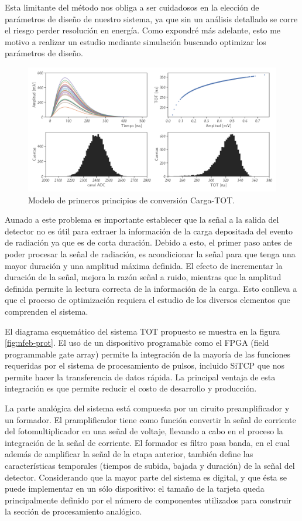 Esta limitante del método nos obliga a ser cuidadosos en la elección de parámetros de diseño de nuestro sistema, ya que sin un análisis detallado se corre el riesgo perder resolución en energía. Como expondré más adelante, esto me motivo a realizar un estudio mediante simulación buscando optimizar los parámetros de diseño.

\begin{figure}
        \centering
        \includegraphics[width=\textwidth]{TOT-model.pdf}
        \caption{Modelo de primeros principios de conversión Carga-TOT.}
        \label{fig:tot-model}
\end{figure}

Aunado a este problema es importante establecer que la señal a la salida del detector no es útil para extraer la información de la carga depositada del evento de radiación ya que es de corta duración. Debido a esto, el primer paso antes de poder procesar la señal de radiación, es acondicionar la señal para que tenga una mayor duración y una amplitud máxima definida. El efecto de incrementar la duración de la señal, mejora la razón señal a ruido, mientras que la amplitud definida permite la lectura correcta de la información de la carga. Esto conlleva a que el proceso de optimización requiera el estudio de los diversos elementos que comprenden el sistema.

El diagrama esquemático del sistema TOT propuesto se muestra en la figura \ref{fig:nfeb-prot}. El uso de un dispositivo programable como el FPGA (field programmable gate array) permite la integración de la mayoría de las funciones requeridas por el sistema de procesamiento de pulsos, incluido SiTCP que nos permite hacer la transferencia de datos rápida. La principal ventaja de esta integración es que permite reducir el costo de desarrollo y producción.

La parte analógica del sistema está compuesta por un ciruito preamplificador y un formador.  El pramplificador tiene como función convertir la señal de corriente del fotomultiplicador en una señal de voltaje, llevando a cabo en el proceso la integración de la señal de corriente. El formador es filtro pasa banda, en el cual además de amplificar la señal de la etapa anterior, también define las características temporales (tiempos de subida, bajada y duración) de la señal del detector. Considerando que la mayor parte del sistema es digital, y que ésta se puede implementar en un sólo dispositivo: el tamaño de la tarjeta queda principalmente definido por el número de componentes utilizados para construir la sección de procesamiento analógico.

